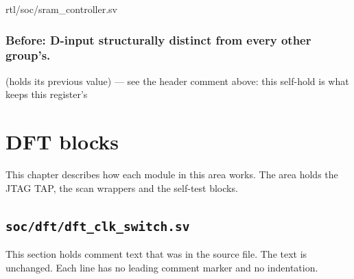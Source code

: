 \begin{relocated}{rtl/soc/sram_controller.sv}
\subsection*{Before: D-input structurally distinct from every other group's.}

\begin{textblock}
(holds its previous value) — see the header comment
above: this self-hold is what keeps this register's
\end{textblock}

\end{relocated}












\chapter{DFT blocks}\label{tm:ch:mod-dft-blocks}

This chapter describes how each module in this area works. The area holds the JTAG TAP, the scan wrappers and the self-test blocks.

\section{\texttt{soc/dft/dft\_clk\_switch.sv}}\label{tm:mod:dft-clk-switch}

This section holds comment text that was in the source file. The text is unchanged. Each line has no leading comment marker and no indentation.

